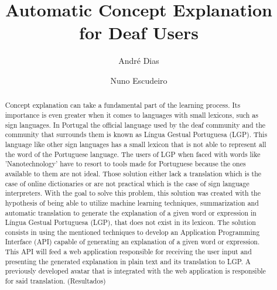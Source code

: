 \documentclass[runningheads]{llncs}
\begin{document}
%
\title{Automatic Concept Explanation for Deaf Users}
%
%
\author{André Dias \and
Nuno Escudeiro}
%
%
%
\maketitle              %
%
\begin{abstract}
    Concept explanation can take a fundamental part of the learning process.
    Its importance is even greater when it comes to languages with small lexicons, such as sign languages.
    In Portugal the official language used by the deaf community and the community that surrounds them is known as Língua Gestual Portuguesa (LGP).
    This language like other sign languages has a small lexicon that is not able to represent all the word of the Portuguese language.
    The users of LGP when faced with words like 'Nanotechnology' have to resort to tools made for Portuguese because the ones available to them are not ideal.
    Those solution either lack a translation which is the case of online dictionaries or are not practical which is the case of sign language interpreters.
    With the goal to solve this problem, this solution was created with the hypothesis of being able to utilize machine learning techniques, summarization and automatic translation to generate the explanation of a given word or expression in Língua Gestual Portuguesa (LGP), that does not exist in its lexicon.
    The solution consists in using the mentioned techniques to develop an Application Programming Interface (API) capable of generating an explanation of a given word or expression.
    This API will feed a web application responsible for receiving the user input and presenting the generated explanation in plain text and its translation to LGP.
    A previously developed avatar that is integrated with the web application is responsible for said translation.
    (Resultados)

\end{abstract}
%
%
%
\end{document}
